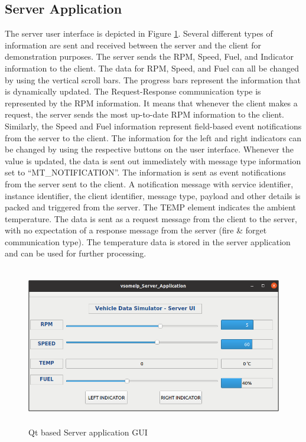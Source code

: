\subsection{Server Application}
The server user interface is depicted in Figure \ref{fig:serverUI}. Several different types of information are sent and received between the server and the client for demonstration purposes. The server sends the RPM, Speed, Fuel, and Indicator information to the client. The data for RPM, Speed, and Fuel can all be changed by using the vertical scroll bars. The progress bars represent the information that is dynamically updated. The Request-Response communication type is represented by the RPM information. It means that whenever the client makes a request, the server sends the most up-to-date RPM information to the client. Similarly, the Speed and Fuel information represent field-based event notifications from the server to the client. The information for the left and right indicators can be changed by using the respective buttons on the user interface. Whenever the value is updated, the data is sent out immediately with message type information set to “MT\_NOTIFICATION”. The information is sent as event notifications from the server sent to the client. A notification message with service identifier, instance identifier, the client identifier, message type, payload and other details is packed and triggered from the server. The TEMP element indicates the ambient temperature. The data is sent as a request message from the client to the server, with no expectation of a response message from the server (fire \& forget communication type). The temperature data is stored in the server application and can be used for further processing.

\begin{figure}[!htb]
	\centering
		\includegraphics[width=1\textwidth,height=7cm]{images/serverUI.png}
	\caption{Qt based Server application GUI}
	\label{fig:serverUI}
\end{figure}

